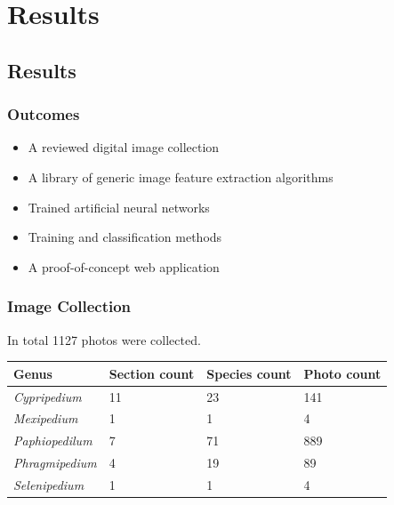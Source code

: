 \documentclass[]{beamer}
\begin{document}
\section{Results}

    \subsection{Results}

    \begin{frame}
        \frametitle{Outcomes}

        \begin{itemize}
            \item A reviewed digital image collection
            \item A library of generic image feature extraction algorithms
            \item Trained artificial neural networks
            \item Training and classification methods
            \item A proof-of-concept web application
        \end{itemize}
    \end{frame}

    \begin{frame}[plain]
        \frametitle{Image Collection}

        In total 1127 photos were collected.

        \begin{table}[h]\scriptsize
            \begin{center}
            \begin{tabular}{llll}
            \toprule
            \textbf{Genus} & \textbf{Section count} & \textbf{Species count} & \textbf{Photo count} \\
            \midrule
            \textit{Cypripedium} & 11 & 23 & 141 \\
            \textit{Mexipedium} & 1 & 1 & 4 \\
            \textit{Paphiopedilum} & 7 & 71 & 889 \\
            \textit{Phragmipedium} & 4 & 19 & 89 \\
            \textit{Selenipedium} & 1 & 1 & 4 \\
            \bottomrule
            \end{tabular}
            \end{center}
        \end{table}
    \end{frame}
\end{document}
